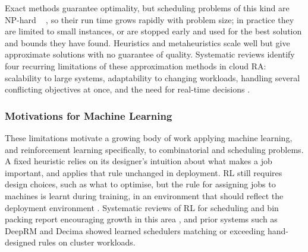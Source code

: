 \documentclass[12pt]{article}
\providecommand{\DIFaddtex}[1]{{\color{red}#1}} %
\providecommand{\DIFdeltex}[1]{} %
\providecommand{\DIFaddbegin}{} %
\providecommand{\DIFaddend}{} %
\providecommand{\DIFdelbegin}{} %
\providecommand{\DIFdelend}{} %
\providecommand{\DIFadd}[1]{\texorpdfstring{\DIFaddtex{#1}}{#1}} %
\providecommand{\DIFdel}[1]{\texorpdfstring{\DIFdeltex{#1}}{}} %
\providecommand{\DIFscaledelfig}{0.5}
\newlength{\DIFdelgraphicswidth} %
\newlength{\DIFdelgraphicsheight} %
\providecommand{\DIFaddincludegraphics}[2][]{{\color{blue}\fbox{\DIFOincludegraphics[#1]{#2}}}} %
\providecommand{\DIFdelincludegraphics}[2][]{%
\sbox{\DIFdelgraphicsbox}{\DIFOincludegraphics[#1]{#2}}%
\settoboxwidth{\DIFdelgraphicswidth}{\DIFdelgraphicsbox} %
\settoboxtotalheight{\DIFdelgraphicsheight}{\DIFdelgraphicsbox} %
\scalebox{\DIFscaledelfig}{%
\parbox[b]{\DIFdelgraphicswidth}{\usebox{\DIFdelgraphicsbox}\\[-\baselineskip] \rule{\DIFdelgraphicswidth}{0em}}\llap{\resizebox{\DIFdelgraphicswidth}{\DIFdelgraphicsheight}{%
\setlength{\unitlength}{\DIFdelgraphicswidth}%
\begin{picture}(1,1)%
\thicklines\linethickness{2pt} %
{\color[rgb]{1,0,0}\put(0,0){\framebox(1,1){}}}%
{\color[rgb]{1,0,0}\put(0,0){\line( 1,1){1}}}%
{\color[rgb]{1,0,0}\put(0,1){\line(1,-1){1}}}%
\end{picture}%
}\hspace*{3pt}}} %
} %
\DeclareRobustCommand{\DIFaddbegin}{\DIFOaddbegin \let\includegraphics\DIFaddincludegraphics} %
\DeclareRobustCommand{\DIFaddend}{\DIFOaddend \let\includegraphics\DIFOincludegraphics} %
\DeclareRobustCommand{\DIFdelbegin}{\DIFOdelbegin \let\includegraphics\DIFdelincludegraphics} %
\DeclareRobustCommand{\DIFdelend}{\DIFOaddend \let\includegraphics\DIFOincludegraphics} %
\begin{document}
Exact methods guarantee optimality\DIFdelbegin \DIFdel{on }\DIFdelend \DIFaddbegin \DIFadd{, but scheduling problems of this kind are NP-hard \mbox{%
\cite{lenstra1977complexity}}\hskip0pt%
, so their run time grows rapidly with problem size; in practice they are limited to }\DIFaddend small instances, \DIFdelbegin \DIFdel{scale terribly, and are then only useful for lower bound estimates}\DIFdelend \DIFaddbegin \DIFadd{or are stopped early and used for the best solution and bounds they have found}\DIFaddend . Heuristics and metaheuristics scale well \DIFdelbegin \DIFdel{, but can yield approximate solution that may not be sufficiently accurate}\DIFdelend \DIFaddbegin \DIFadd{but give approximate solutions with no guarantee of quality}\DIFaddend . Systematic reviews \DIFdelbegin \DIFdel{within this field identify four major problems }\DIFdelend \DIFaddbegin \DIFadd{identify four recurring limitations }\DIFaddend of these approximation methods \DIFdelbegin \DIFdel{: scalability, adaptability, generalisation multi-objective complexity, high computational cost with scale, and }\DIFdelend \DIFaddbegin \DIFadd{in cloud RA: scalability to large systems, adaptability to changing workloads, handling several conflicting objectives at once, and the need for }\DIFaddend real-time \DIFdelbegin \DIFdel{decision making }\DIFdelend \DIFaddbegin \DIFadd{decisions }\DIFaddend \cite{mohamaddiah2014, lbts2024, 10854610, DAHMANI2025100616, ml_ra_litrev2025, hu2021attend2pack}.

\subsubsection{Motivations for Machine Learning}
\DIFdelbegin \DIFdel{The above mentioned }\DIFdelend \DIFaddbegin \DIFadd{These }\DIFaddend limitations motivate a growing body of work \DIFdelbegin \DIFdel{of }\DIFdelend applying machine learning, and reinforcement learning specifically, to combinatorial and scheduling problems. A fixed heuristic relies on \DIFdelbegin \DIFdel{designer intuition to determine }\DIFdelend \DIFaddbegin \DIFadd{its designer's intuition about }\DIFaddend what makes a job important\DIFaddbegin \DIFadd{, }\DIFaddend and applies that rule unchanged \DIFdelbegin \DIFdel{through }\DIFdelend \DIFaddbegin \DIFadd{in }\DIFaddend deployment. RL still requires design choices\DIFaddbegin \DIFadd{, }\DIFaddend such as what \DIFdelbegin \DIFdel{should it optimisefor}\DIFdelend \DIFaddbegin \DIFadd{to optimise}\DIFaddend , but the \DIFdelbegin \DIFdel{policy on how to decide assignments of a job to a machine are }\DIFdelend \DIFaddbegin \DIFadd{rule for assigning jobs to machines is }\DIFaddend learnt during training\DIFaddbegin \DIFadd{, }\DIFaddend in an environment that should reflect the deployment environment \cite{ml_ra_litrev2025}. Systematic reviews of RL for scheduling \DIFdelbegin \DIFdel{or }\DIFdelend \DIFaddbegin \DIFadd{and }\DIFaddend bin packing report encouraging growth in this area \cite{DAHMANI2025100616}, and prior systems \DIFdelbegin \DIFdel{like }\DIFdelend \DIFaddbegin \DIFadd{such as }\DIFaddend DeepRM \cite{mao2016deeprm} and Decima \cite{mao2019decima} showed learned schedulers matching or exceeding hand-designed rules on cluster workloads.
\end{document}
